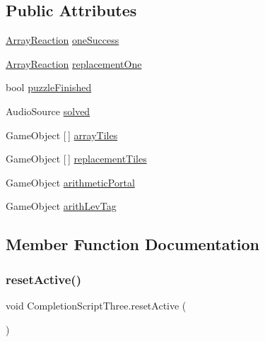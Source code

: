 \subsection*{Public Attributes}
\begin{DoxyCompactItemize}
\item 
\hyperlink{class_array_reaction}{Array\+Reaction} \hyperlink{class_completion_script_three_a1c12a8282a42059d70e6ef786b9def17}{one\+Success}
\item 
\hyperlink{class_array_reaction}{Array\+Reaction} \hyperlink{class_completion_script_three_adc0fcdc0b8a3acf4f200c86e2af1e3c9}{replacement\+One}
\item 
bool \hyperlink{class_completion_script_three_acff2be49aa067d7a15ae9f8754391be3}{puzzle\+Finished}
\item 
Audio\+Source \hyperlink{class_completion_script_three_ac7eba76f069c14642b9fbbf1dbffd81d}{solved}
\item 
Game\+Object \mbox{[}$\,$\mbox{]} \hyperlink{class_completion_script_three_a8d5751f5f7dd7541d6bcd2fd51206f37}{array\+Tiles}
\item 
Game\+Object \mbox{[}$\,$\mbox{]} \hyperlink{class_completion_script_three_a40c51d90e7210b7da4018ac43dc468f7}{replacement\+Tiles}
\item 
Game\+Object \hyperlink{class_completion_script_three_ab5fc9fb13950a145c8c92e9f5b71001f}{arithmetic\+Portal}
\item 
Game\+Object \hyperlink{class_completion_script_three_a37087f61b2e788fa111e68bc14f50e14}{arith\+Lev\+Tag}
\end{DoxyCompactItemize}


\subsection{Member Function Documentation}
\mbox{\label{class_completion_script_three_a1db60c85017b1469f792649b75e9397b}} 
\subsubsection{\texorpdfstring{reset\+Active()}{resetActive()}}
{\footnotesize\ttfamily void Completion\+Script\+Three.\+reset\+Active (\begin{DoxyParamCaption}{ }\end{DoxyParamCaption})}

